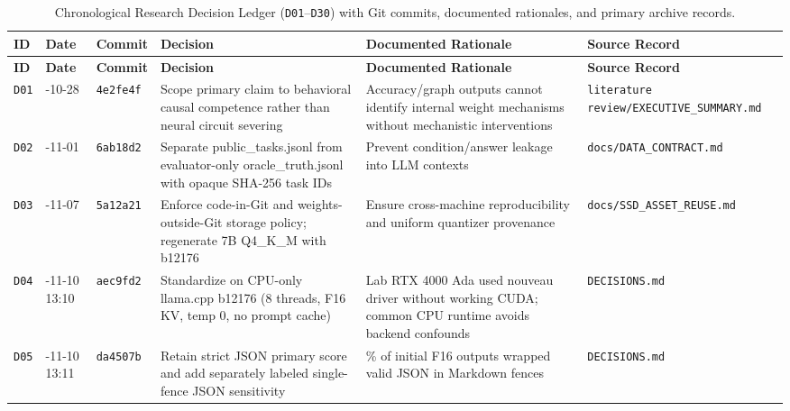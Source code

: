 {\footnotesize
\setlength{\tabcolsep}{3.5pt}
\begin{longtable}{@{}>{\raggedright\arraybackslash}p{0.9cm}>{\raggedright\arraybackslash}p{1.7cm}>{\raggedright\arraybackslash}p{1.3cm}>{\raggedright\arraybackslash}p{4.2cm}>{\raggedright\arraybackslash}p{4.0cm}>{\raggedright\arraybackslash}p{2.3cm}@{}}
\caption{Chronological Research Decision Ledger (\texttt{D01}--\texttt{D30}) with Git commits, documented rationales, and primary archive records.}\label{tab:decision_ledger}\\
\toprule
\textbf{ID} & \textbf{Date} & \textbf{Commit} & \textbf{Decision} & \textbf{Documented Rationale} & \textbf{Source Record} \\
\midrule
\endfirsthead
\toprule
\textbf{ID} & \textbf{Date} & \textbf{Commit} & \textbf{Decision} & \textbf{Documented Rationale} & \textbf{Source Record} \\
\midrule
\endhead
\bottomrule
\endfoot
\texttt{D01} & 2026-\allowbreak{}10-\allowbreak{}28 & \texttt{4e2fe4f} & Scope primary claim to behavioral causal competence rather than neural circuit severing & Accuracy/\allowbreak{}graph outputs cannot identify internal weight mechanisms without mechanistic interventions & \texttt{literature review/\allowbreak{}EXECUTIVE\_SUMMARY.md} \\[2pt]
\texttt{D02} & 2026-\allowbreak{}11-\allowbreak{}01 & \texttt{6ab18d2} & Separate public\_tasks.jsonl from evaluator-\allowbreak{}only oracle\_truth.jsonl with opaque SHA-\allowbreak{}256 task IDs & Prevent condition/\allowbreak{}answer leakage into LLM contexts & \texttt{docs/\allowbreak{}DATA\_CONTRACT.md} \\[2pt]
\texttt{D03} & 2026-\allowbreak{}11-\allowbreak{}07 & \texttt{5a12a21} & Enforce code-\allowbreak{}in-\allowbreak{}Git and weights-\allowbreak{}outside-\allowbreak{}Git storage policy; regenerate 7B Q4\_K\_M with b12176 & Ensure cross-\allowbreak{}machine reproducibility and uniform quantizer provenance & \texttt{docs/\allowbreak{}SSD\_ASSET\_REUSE.md} \\[2pt]
\texttt{D04} & 2026-\allowbreak{}11-\allowbreak{}10 13:10 & \texttt{aec9fd2} & Standardize on CPU-\allowbreak{}only llama.cpp b12176 (8 threads, F16 KV, temp 0, no prompt cache) & Lab RTX 4000 Ada used nouveau driver without working CUDA; common CPU runtime avoids backend confounds & \texttt{DECISIONS.md} \\[2pt]
\texttt{D05} & 2026-\allowbreak{}11-\allowbreak{}10 13:11 & \texttt{da4507b} & Retain strict JSON primary score and add separately labeled single-\allowbreak{}fence JSON sensitivity & 100\% of initial F16 outputs wrapped valid JSON in Markdown fences & \texttt{DECISIONS.md} \\[2pt]

\end{longtable}}
